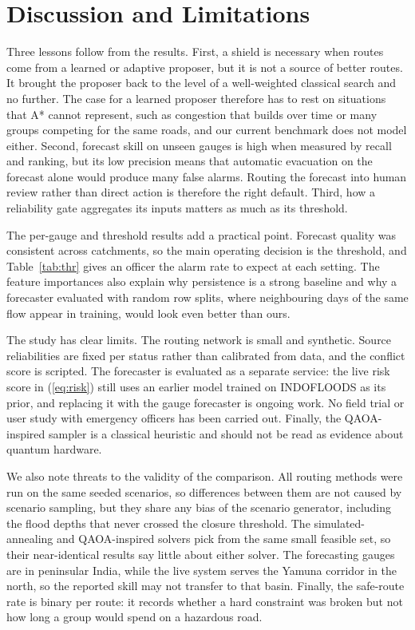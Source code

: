 \documentclass[conference]{IEEEtran}
\begin{document}
\section{Discussion and Limitations}
Three lessons follow from the results. First, a shield is necessary when routes come from a learned or adaptive proposer, but it is not a source of better routes. It brought the proposer back to the level of a well-weighted classical search and no further. The case for a learned proposer therefore has to rest on situations that A* cannot represent, such as congestion that builds over time or many groups competing for the same roads, and our current benchmark does not model either. Second, forecast skill on unseen gauges is high when measured by recall and ranking, but its low precision means that automatic evacuation on the forecast alone would produce many false alarms. Routing the forecast into human review rather than direct action is therefore the right default. Third, how a reliability gate aggregates its inputs matters as much as its threshold.

The per-gauge and threshold results add a practical point. Forecast quality was consistent across catchments, so the main operating decision is the threshold, and Table~\ref{tab:thr} gives an officer the alarm rate to expect at each setting. The feature importances also explain why persistence is a strong baseline and why a forecaster evaluated with random row splits, where neighbouring days of the same flow appear in training, would look even better than ours.

The study has clear limits. The routing network is small and synthetic. Source reliabilities are fixed per status rather than calibrated from data, and the conflict score is scripted. The forecaster is evaluated as a separate service: the live risk score in (\ref{eq:risk}) still uses an earlier model trained on INDOFLOODS as its prior, and replacing it with the gauge forecaster is ongoing work. No field trial or user study with emergency officers has been carried out. Finally, the QAOA-inspired sampler is a classical heuristic and should not be read as evidence about quantum hardware.

We also note threats to the validity of the comparison. All routing methods were run on the same seeded scenarios, so differences between them are not caused by scenario sampling, but they share any bias of the scenario generator, including the flood depths that never crossed the closure threshold. The simulated-annealing and QAOA-inspired solvers pick from the same small feasible set, so their near-identical results say little about either solver. The forecasting gauges are in peninsular India, while the live system serves the Yamuna corridor in the north, so the reported skill may not transfer to that basin. Finally, the safe-route rate is binary per route: it records whether a hard constraint was broken but not how long a group would spend on a hazardous road.
\end{document}
